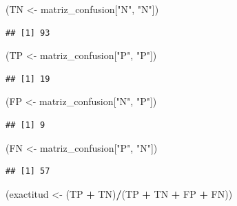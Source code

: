 \documentclass[
  12pt,
]{book}
\newenvironment{Shaded}{\begin{snugshade}}{\end{snugshade}}
\newcommand{\NormalTok}[1]{#1}
\newcommand{\OperatorTok}[1]{\textcolor[rgb]{0.81,0.36,0.00}{\textbf{#1}}}
\newcommand{\StringTok}[1]{\textcolor[rgb]{0.31,0.60,0.02}{#1}}
\theoremstyle{definition}
\theoremstyle{definition}
\theoremstyle{definition}
\theoremstyle{remark}
\begin{document}
\begin{Shaded}
\begin{Highlighting}[]
\NormalTok{(TN <-}\StringTok{ }\NormalTok{matriz_confusion[}\StringTok{"N"}\NormalTok{, }\StringTok{"N"}\NormalTok{])}
\end{Highlighting}
\end{Shaded}

\begin{verbatim}
## [1] 93
\end{verbatim}

\begin{Shaded}
\begin{Highlighting}[]
\NormalTok{(TP <-}\StringTok{ }\NormalTok{matriz_confusion[}\StringTok{"P"}\NormalTok{, }\StringTok{"P"}\NormalTok{])}
\end{Highlighting}
\end{Shaded}

\begin{verbatim}
## [1] 19
\end{verbatim}

\begin{Shaded}
\begin{Highlighting}[]
\NormalTok{(FP <-}\StringTok{ }\NormalTok{matriz_confusion[}\StringTok{"N"}\NormalTok{, }\StringTok{"P"}\NormalTok{])}
\end{Highlighting}
\end{Shaded}

\begin{verbatim}
## [1] 9
\end{verbatim}

\begin{Shaded}
\begin{Highlighting}[]
\NormalTok{(FN <-}\StringTok{ }\NormalTok{matriz_confusion[}\StringTok{"P"}\NormalTok{, }\StringTok{"N"}\NormalTok{])}
\end{Highlighting}
\end{Shaded}

\begin{verbatim}
## [1] 57
\end{verbatim}

\begin{Shaded}
\begin{Highlighting}[]
\NormalTok{(exactitud <-}\StringTok{ }\NormalTok{(TP }\OperatorTok{+}\StringTok{ }\NormalTok{TN)}\OperatorTok{/}\NormalTok{(TP }\OperatorTok{+}\StringTok{ }\NormalTok{TN }\OperatorTok{+}\StringTok{ }\NormalTok{FP }\OperatorTok{+}\StringTok{ }\NormalTok{FN))}
\end{Highlighting}
\end{Shaded}
\end{document}
